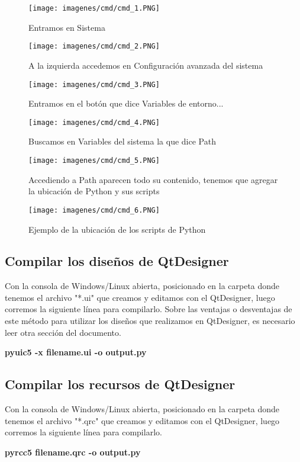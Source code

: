 \begin{figure}[H]
    \centering
    \texttt{[image: imagenes/cmd/cmd\_1.PNG]}
    \caption{Entramos en Sistema}
\end{figure}

\begin{figure}[H]
    \centering
    \texttt{[image: imagenes/cmd/cmd\_2.PNG]}
    \caption{A la izquierda accedemos en Configuraci\'on avanzada del sistema}
\end{figure}

\begin{figure}[H]
    \centering
    \texttt{[image: imagenes/cmd/cmd\_3.PNG]}
    \caption{Entramos en el bot\'on que dice Variables de entorno...}
\end{figure}

\begin{figure}[H]
    \centering
    \texttt{[image: imagenes/cmd/cmd\_4.PNG]}
    \caption{Buscamos en Variables del sistema la que dice Path}
\end{figure}

\begin{figure}[H]
    \centering
    \texttt{[image: imagenes/cmd/cmd\_5.PNG]}
    \caption{Accediendo a Path aparecen todo su contenido, tenemos que agregar la ubicaci\'on de Python y sus scripts}
\end{figure}

\begin{figure}[H]
    \centering
    \texttt{[image: imagenes/cmd/cmd\_6.PNG]}
    \caption{Ejemplo de la ubicaci\'on de los scripts de Python}
\end{figure}

\subsection{Compilar los dise\~nos de QtDesigner}
\label{compilar_design}
Con la consola de Windows/Linux abierta, posicionado en la carpeta donde tenemos el archivo "*.ui" que creamos y editamos con el QtDesigner,
luego corremos la siguiente l\'inea para compilarlo. Sobre las ventajas o desventajas de este m\'etodo para utilizar los dise\~nos que realizamos en QtDesigner,
es necesario leer otra secci\'on del documento.

\begin{center}
    \textbf{pyuic5 -x filename.ui -o output.py}
\end{center}

\subsection{Compilar los recursos de QtDesigner}
\label{compilar_recurso}
Con la consola de Windows/Linux abierta, posicionado en la carpeta donde tenemos el archivo "*.qrc" que creamos y editamos con el QtDesigner,
luego corremos la siguiente l\'inea para compilarlo.

\begin{center}
    \textbf{pyrcc5 filename.qrc -o output.py}
\end{center}
